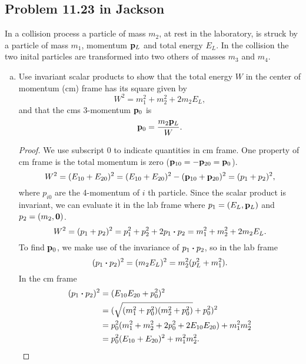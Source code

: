 \documentclass[10pt]{article}
\begin{document}
\subsection{Problem 11.23 in Jackson}
In a collision process a particle of mass $m_2$, at rest in the laboratory, is struck by a particle of mass $m_1$, momentum $\vb{p}_L$ and total energy $E_L$. In the collision the two inital particles are transformed into two others of masses $m_3$ and $m_4$.
\begin{enumerate}[(a)]
	\item Use invariant scalar products to show that the total energy $W$ in the center of momentum (cm) frame has its square given by 
		\begin{equation}
			W^2 = m_1^2 + m_2^2 + 2m_2 E_L,
		\end{equation}
		and that the cms 3-momentum $\vb{p}_0$ is 
		\begin{equation}
			\vb{p}_0 = \frac{m_2 \vb{p}_L}{W}.
		\end{equation}
		\begin{proof}
			We use subscript 0 to indicate quantities in cm frame. One property of cm frame is the total momentum is zero ($\vb{p}_{10} = -\vb{p}_{20} = \vb{p}_0$).
			\begin{equation}
				W^2 = (E_{10} + E_{20})^2 = (E_{10} + E_{20})^2 - (\vb{p}_{10} + \vb{p}_{20})^2 = (p_{1} + p_{2})^2,
			\end{equation}
			where $p_{i0}$ are the 4-momentum of $i$ th particle. Since the scalar product is invariant, we can evaluate it in the lab frame where $p_1 = (E_L, \vb{p}_L)$ and $p_2 = (m_2, \vb{0})$.
			\begin{equation}
				W^2 = (p_{1} + p_{2})^2 = p_1^2 + p_2^2 + 2p_1 \vdot p_2 = m_1^2 + m_2^2 + 2m_2 E_L. 
			\end{equation}
			To find $\vb{p}_0$, we make use of the invariance of $p_1 \vdot p_2$, so in the lab frame 
			\begin{equation}
				(p_1 \vdot p_2)^2 = (m_2 E_L)^2 = m_2^2 (p_L^2 + m_1^2).
			\end{equation}
			In the cm frame 
			\begin{align*}
				(p_1 \vdot p_2)^2 &= (E_{10}E_{20} + p_0^2)^2 \\
								  &= (\sqrt{(m_1^2 + p_0^2)(m_2^2 + p_0^2)} + p_0^2)^2 \\
								  &= p_0^2 (m_1^2 + m_2^2 + 2 p_0^2 + 2E_{10}E_{20}) + m_1^2 m_2^2 \\
								  &= p_0^2(E_{10}+E_{20})^2 + m_1^2m_2^2.
			\end{align*}

\end{proof}
\end{enumerate}
\end{document}
